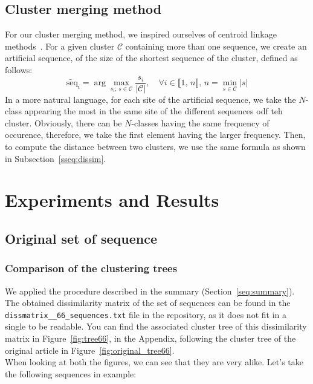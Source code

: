 \documentclass[english,13pt,a4paper]{article}
\theoremstyle{definition}
\theoremstyle{remark}
\theoremstyle{defstyle}
\begin{document}
\subsection{Cluster merging method}\label{ssec:merge}

For our cluster merging method, we inspired ourselves of centroid linkage methods~\cite{duda1973pattern}. For a given cluster $\mathcal{C}$ containing more than one sequence, we create an artificial sequence, of the size of the shortest sequence of the cluster, defined as follows:
\[
    \widetilde{\text{seq}}_i = \arg \max_{s_i; \,s \in \mathcal C} \frac{s_i}{|\mathcal C|},  \quad \forall i \in \llbracket 1, \, n \rrbracket, \, n = \min_{s \in \mathcal{C}} |s| 
\]
In a more natural language, for each site of the artificial sequence, we take the $N$-class appearing the most in the same site of the different sequences odf teh cluster. Obviously, there can be $N$-classes having the same frequency of occurence, therefore, we take the first element having the larger frequency. Then, to compute the distance between two clusters, we use the same formula as shown in Subsection~\ref{sseq:dissim}. 



\section{Experiments and Results}

\subsection{Original set of sequence}

\subsubsection{Comparison of the clustering trees}

We applied the procedure described in the summary (Section~\ref{seq:summary}). The obtained dissimilarity matrix of the set of sequences can be found in the \texttt{dissmatrix\_\_66\_sequences.txt} file in the repository, as it does not fit in a single to be readable. You can find the associated cluster tree of this dissimilarity matrix in Figure~\ref{fig:tree66}, in the Appendix, following the cluster tree of the original article in Figure~\ref{fig:original_tree66}.\\

When looking at both the figures, we can see that they are very alike. Let's take the following sequences in example:
\end{document}
